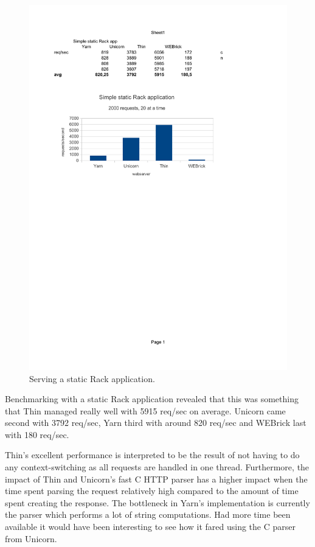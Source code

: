 \begin{figure}[htb]
  \centering
  \includegraphics[width=1.0\textwidth]{benchmark/static.pdf}
  \caption{Serving a static Rack application.}
  \label{staticbench}
\end{figure}

Benchmarking with a static Rack application revealed that this was something
that Thin managed really well with 5915 req/sec on average.  Unicorn came
second with 3792 req/sec, Yarn third with around 820 req/sec and
WEBrick last with 180 req/sec. 

Thin's excellent performance is interpreted to be the result of not having to
do any context-switching as all requests are handled in one thread.
Furthermore, the impact of Thin and Unicorn's fast C HTTP parser has a
higher impact when the time spent parsing the request relatively high compared
to the amount of time spent creating the response. The bottleneck in Yarn's
implementation is currently the parser which performs a lot of string
computations. Had more time been available it would have been interesting to
see how it fared using the C parser from Unicorn.

